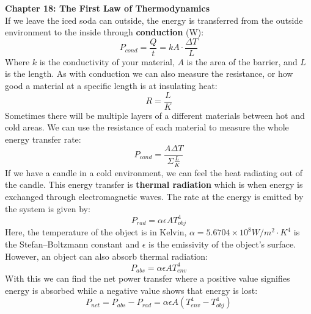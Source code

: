 \documentclass[11pt]{article}
\begin{document}
    \newpage
    \noindent \textbf{Chapter 18: The First Law of Thermodynamics}
    \\ \noindent \newline If we leave the iced soda can outside,
    the energy is transferred from the outside environment to the inside
    through \textbf{conduction} (W):
    \begin{equation}
        P_{cond} = \frac{Q}{t} = kA\cdot \frac{\Delta T}{L} \tag{conduction}
    \end{equation}
    \noindent Where $k$ is the conductivity of your material,
    $A$ is the area of the barrier, and $L$ is the length.
    As with conduction we can also measure the resistance,
    or how good a material at a specific length is at insulating heat:
    \begin{equation}
        R = \frac{L}{K} \tag{resistance}
    \end{equation}
    \noindent Sometimes there will be multiple layers of a different materials
    between hot and cold areas. We can use the resistance of each material
    to measure the whole energy transfer rate:
    \begin{equation}
        P_{cond} = \frac{A \Delta T}{\Sigma \frac{L}{K} } \tag{conduction}
    \end{equation}
    \noindent If we have a candle in a cold environment,
    we can feel the heat radiating out of the candle.
    This energy transfer is \textbf{thermal radiation}
    which is when energy is exchanged through electromagnetic waves.
    The rate at the energy is emitted by the system is given by:
    \begin{equation}
        P_{rad} = \alpha \epsilon A T_{obj}^4 \tag{radiation rate}
    \end{equation}
    \noindent Here, the temperature of the object is in Kelvin,
    $\alpha = 5.6704 \times 10^8 W/m^2\cdot K^4$ is the Stefan–Boltzmann constant
    and $\epsilon$ is the emissivity of the object’s surface.
    However, an object can also absorb thermal radiation:
    \begin{equation}
        P_{abs} = \alpha \epsilon A T_{env}^4 \tag{absorption rate}
    \end{equation}
    With this we can find the net power transfer where a positive value
    signifies energy is absorbed while a negative value shows that energy is lost:
    \begin{equation}
        P_{net} = P_{abs} - P_{rad} = \alpha \epsilon A (T_{env}^4 - T_{obj}^4) \tag{net power}
    \end{equation}
    
\end{document}
